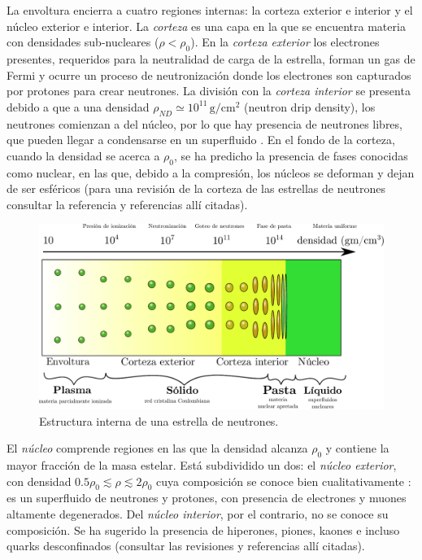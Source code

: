 La envoltura encierra a cuatro regiones internas: la corteza exterior e interior y el núcleo exterior e interior. La \emph{corteza} es una capa en la que se encuentra materia con densidades sub-nucleares ($\rho < \rho_0$). En la \emph{corteza exterior} los electrones presentes, requeridos para la neutralidad de carga de la estrella, forman un gas de Fermi y ocurre un proceso de neutronización donde los electrones son capturados por protones para crear neutrones. La división con la \emph{corteza interior} se presenta debido a que a una densidad $\rho_{ND}\simeq 10^{11}\, \si{\gram\per\centi\metre^2}$ (neutron drip density), los neutrones comienzan a  del núcleo, por lo que hay presencia de neutrones libres, que pueden llegar a condensarse en un superfluido \cite{Baldo2005}. En el fondo de la corteza, cuando la densidad se acerca a $\rho_0$, se ha predicho la presencia de fases conocidas como  nuclear, en las que, debido a la compresión, los núcleos se deforman y dejan de ser esféricos (para una revisión de la corteza de las estrellas de neutrones consultar la referencia \cite{Chamel2008} y referencias allí citadas). 



\begin{figure}[H]
    \centering
    \includegraphics[width=420pt]{figures/Density.pdf}
    \caption[Estructura interna de una estrella de neutrones]{Estructura interna de una estrella de neutrones.\protect\footnotemark}
    \label{NSS}
\end{figure}

El \emph{núcleo} comprende regiones en las que la densidad alcanza $\rho_0$ y contiene la mayor fracción de la masa estelar. Está subdividido un dos: el \emph{núcleo exterior}, con densidad $\num{0.5}\rho_0\lesssim\rho\lesssim 2\rho_0$  cuya composición se conoce bien cualitativamente \cite{Haensel2007}: es un superfluido de neutrones y protones, con presencia de electrones y muones altamente degenerados. Del \emph{núcleo interior}, por el contrario, no se conoce su composición. Se ha sugerido la presencia de hiperones, piones, kaones e incluso quarks desconfinados (consultar las revisiones \cite{Lattimer2004,Potekhin2010} y referencias allí citadas).

